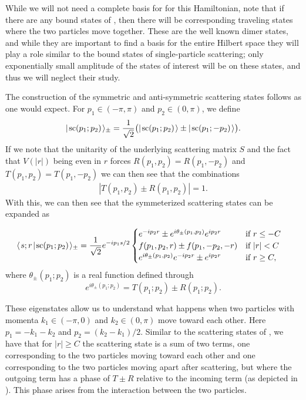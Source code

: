 \documentclass[../thesis-main/thesis-main]{subfiles}
\begin{document}
While we will not need a complete basis for for this Hamiltonian, note that if there are any bound states of , then there will be corresponding traveling states where the two particles move together.  These are the well known dimer states, and while they are important to find a basis for the entire Hilbert space they will play a role similar to the bound states of single-particle scattering; only exponentially small amplitude of the states of interest will be on these states, and thus we will neglect their study.



The construction of the symmetric and anti-symmetric scattering states follows as one would expect. For $p_1\in (-\pi,\pi)$ and $p_2\in (0,\pi)$, we define
\begin{align}
  |\mspace{2mu} \mathrm{sc}(p_1;p_2) \mspace{2mu} \rangle_\pm = \frac{1}{\sqrt2}\big(|\mspace{2mu} \mathrm{sc}(p_1;p_2) \mspace{2mu} \rangle \pm |\mspace{2mu} \mathrm{sc}(p_1;-p_2) \mspace{2mu} \rangle\big).
\end{align}
If we note that the unitarity of the underlying scattering matrix $S$ and the fact that $V(|r|)$ being even in $r$ forces $R(p_1,p_2) = R(p_1,-p_2)$ and $T(p_1,p_2)  = T(p_1,-p_2)$ we can then see that the combinations
\begin{align}
  |T(p_1,p_2) \pm R(p_1,p_2)| = 1.  
\end{align}
With this, we can then see that the symmeterized scattering states can be expanded as

\begin{align}
    \langle\mspace{2mu} s;r \mspace{2mu} | \mspace{2mu} \mathrm{sc}(p_1;p_2)\mspace{2mu} \rangle_\pm
      &= \frac{1}{\sqrt{2}}e^{-i p_1 s/2} \begin{cases}  e^{-i p_2 r} \pm e^{i\theta_{\pm}(p_1,p_2)} e^{i p_2 r} &  \text{if }r \leq- C\\
  	f(p_1,p_2,r) \pm f(p_1,-p_2,-r) & \text{if }  |r| < C\\
	  e^{i\theta_{\pm}(p_1,p_2)} e^{-i p_2 r}\pm e^{i p_2 r}  &  \text{if }r \geq C, \end{cases}
\label{eq:symscatter}
\end{align}
where $\theta_{\pm}(p_1;p_2)$ is a real function defined through
\begin{equation}
e^{i\theta_{\pm}(p_1;p_2)}= T(p_1;p_2)\pm R(p_1;p_2). \label{eq:delta_pm}
\end{equation}


These eigenstates allow us to understand what happens when two particles with momenta $k_1\in(-\pi,0)$ and $k_2\in(0,\pi)$ move toward each other. Here $p_1=-k_1-k_2$ and $p_2=(k_2-k_1)/2$.  Similar to the scattering states of , we have that for $|r|\geq C$ the scattering state is a sum of two terms, one corresponding to the two particles moving toward each other and one corresponding to the two particles moving apart after scattering, but where the outgoing term has a  phase of $T\pm R$ relative to the incoming term (as depicted in ). This phase arises from the interaction between the two particles.
\end{document}
